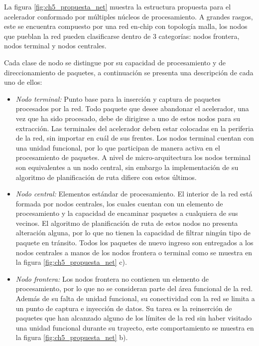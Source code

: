 La figura \ref{fig:ch5_propuesta_net} muestra la estructura propuesta para el acelerador conformado por múltiples núcleos de procesamiento. A grandes rasgos, este se encuentra compuesto por una red en-chip con topología malla, los nodos que pueblan la red pueden clasificarse dentro de 3 categorías: nodos frontera, nodos terminal y nodos centrales.

Cada clase de nodo se distingue por su capacidad de procesamiento y de direccionamiento de paquetes, a continuación se presenta una descripción de cada uno de ellos:

\begin{itemize}

	\item \textit{Nodo terminal:} Punto base para la inserción y captura de paquetes procesados por la red. Todo paquete que desee abandonar el acelerador, una vez que ha sido procesado, debe de dirigirse a uno de estos nodos para su extracción. Las terminales del acelerador deben estar colocadas en la periferia de la red, sin importar en cuál de sus frentes. Los nodos terminal cuentan con una unidad funcional, por lo que participan de manera activa en el procesamiento de paquetes. A nivel de micro-arquitectura los nodos terminal son equivalentes a un nodo central, sin embargo la implementación de su algoritmo de planificación de ruta difiere con estos últimos.

	\item \textit{Nodo central:} Elementos estándar de procesamiento. El interior de la red está formada por nodos centrales, los cuales cuentan con un elemento de procesamiento y la capacidad de encaminar paquetes a cualquiera de sus vecinos. El algoritmo de planificación de ruta de estos nodos no presenta alteración alguna, por lo que no tienen la capacidad de filtrar ningún tipo de paquete en tránsito. Todos los paquetes de nuevo ingreso son entregados a los nodos centrales a manos de los nodos frontera o terminal como se muestra en la figura \ref{fig:ch5_propuesta_net} c).

	\item \textit{Nodo frontera:} Los nodos frontera no contienen un elemento de procesamiento, por lo que no se consideran parte del área funcional de la red. Además de su falta de unidad funcional, su conectividad con la red se limita a un punto de captura e inyección de datos. Su tarea es la reinserción de paquetes que han alcanzado alguno de los límites de la red sin haber visitado una unidad funcional durante su trayecto, este comportamiento se muestra en la figura \ref{fig:ch5_propuesta_net} b).

\end{itemize}


